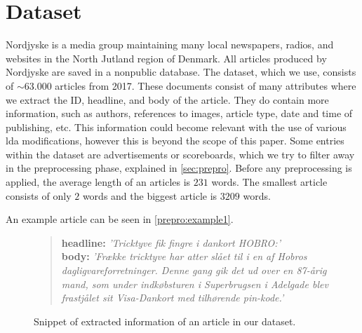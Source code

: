 \section{Dataset}\label{sec:dataset}
Nordjyske is a media group maintaining many local newspapers, radios, and websites in the North Jutland region of Denmark.
All articles produced by Nordjyske are saved in a nonpublic database.
The dataset, which we use, consists of $\sim$$63.000$ articles from 2017.
These documents consist of many attributes where we extract the ID, headline, and body of the article.
They do contain more information, such as authors, references to images, article type, date and time of publishing, etc.
This information could become relevant with the use of various \gls{lda} modifications, however this is beyond the scope of this paper.
Some entries within the dataset are advertisements or scoreboards, which we try to filter away in the preprocessing phase, explained in \autoref{sec:prepro}.
Before any preprocessing is applied, the average length of an articles is $231$ words.
The smallest article consists of only $2$ words and the biggest article is $3209$ words.

An example article can be seen in \autoref{prepro:example1}.

\begin{figure}[h]
	\begin{framed}
		\begin{quote}
			\textbf{headline:} \textit{'Tricktyve fik fingre i dankort HOBRO:'}\\
			\textbf{body:} \textit{'Frække tricktyve har atter slået til i en af Hobros dagligvareforretninger. Denne gang gik det ud over en 87-årig mand, som under indkøbsturen i Superbrugsen i Adelgade blev frastjålet sit Visa-Dankort med tilhørende pin-kode.'}
		\end{quote}
	\end{framed}
		\caption{Snippet of extracted information of an article in our dataset.}
		\label{prepro:example1}
\end{figure}
